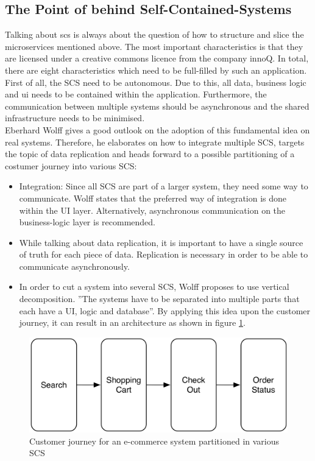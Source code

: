 \subsection{The Point of behind Self-Contained-Systems}
Talking about \acrfull{scs} is always about the question of how to structure and slice the microservices mentioned above.\newline
The most important characteristics is that they are licensed under a creative commons licence from the company innoQ. In total, there are eight characteristics which need to be full-filled by such an application. First of all, the SCS need to be autonomous. Due to this, all data, business logic and \acrshort{ui} needs to be contained within the application. Furthermore, the communication between multiple systems should be asynchronous and the shared infrastructure needs to be minimised. \cite{scs}\newline
\\
Eberhard Wolff gives a good outlook on the adoption of this fundamental idea on real systems. Therefore, he elaborates on how to integrate multiple SCS, targets the topic of data replication and heads forward to a possible partitioning of a costumer journey into various SCS:\newline
\begin{itemize}
    \item Integration: Since all SCS are part of a larger system, they need some way to communicate. Wolff states that the preferred way of integration is done within the UI layer. Alternatively, asynchronous communication on the business-logic layer is recommended.
    \item While talking about data replication, it is important to have a single source of truth for each piece of data. Replication is necessary in order to be able to communicate asynchronously.
    \item In order to cut a system into several SCS, Wolff proposes to use vertical decomposition. ''The systems have to be separated into multiple parts that each have a UI, logic and database''\cite{scsWolf}. By applying this idea upon the customer journey, it can result in an architecture as shown in figure \ref{fig:scsJourney}.
\end{itemize}
\cite{scsWolf}\newline
\begin{figure}[!htb]
    \centering
    \includegraphics[scale=0.2]{pictures/Journey.png}
    \caption{Customer journey for an e-commerce system partitioned in various SCS \cite{scsWolf}}
    \label{fig:scsJourney}
\end{figure}

